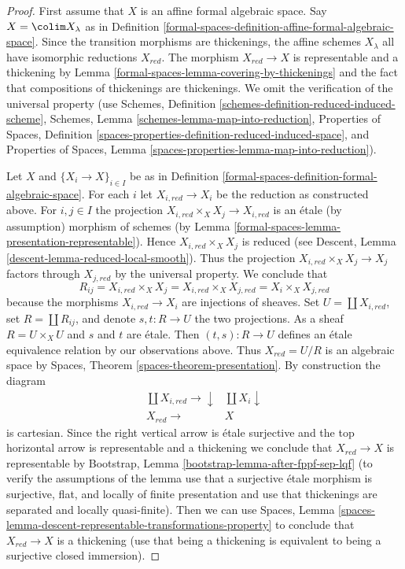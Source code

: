 \begin{proof}
First assume that $X$ is an affine formal algebraic space.
Say $X = \colim X_\lambda$ as in
Definition \ref{formal-spaces-definition-affine-formal-algebraic-space}.
Since the transition morphisms are thickenings, the affine
schemes $X_\lambda$ all have isomorphic reductions $X_{red}$.
The morphism $X_{red} \to X$ is representable and a thickening
by Lemma \ref{formal-spaces-lemma-covering-by-thickenings} and the fact that
compositions of thickenings are thickenings. We omit the
verification of the universal
property (use Schemes, Definition
\ref{schemes-definition-reduced-induced-scheme},
Schemes, Lemma \ref{schemes-lemma-map-into-reduction},
Properties of Spaces, Definition
\ref{spaces-properties-definition-reduced-induced-space}, and
Properties of Spaces, Lemma \ref{spaces-properties-lemma-map-into-reduction}).

\medskip\noindent
Let $X$ and $\{X_i \to X\}_{i \in I}$ be as in
Definition \ref{formal-spaces-definition-formal-algebraic-space}.
For each $i$ let $X_{i, red} \to X_i$ be the reduction as
constructed above. For $i, j \in I$ the projection
$X_{i, red} \times_X X_j \to X_{i, red}$ is an \'etale (by assumption)
morphism of schemes (by Lemma \ref{formal-spaces-lemma-presentation-representable}).
Hence $X_{i, red} \times_X X_j$ is reduced (see
Descent, Lemma \ref{descent-lemma-reduced-local-smooth}).
Thus the projection $X_{i, red} \times_X X_j \to X_j$ factors
through $X_{j, red}$ by the universal property. We conclude that
$$
R_{ij} = X_{i, red} \times_X X_j = X_{i, red} \times_X X_{j, red} =
X_i \times_X X_{j, red}
$$
because the morphisms $X_{i, red} \to X_i$ are injections of sheaves.
Set $U = \coprod X_{i, red}$, set
$R = \coprod R_{ij}$, and denote $s, t : R \to U$ the two
projections. As a sheaf $R = U \times_X U$ and $s$ and $t$
are \'etale. Then $(t, s) : R \to U$ defines an \'etale equivalence
relation by our observations above. Thus $X_{red} = U/R$ is an
algebraic space by Spaces, Theorem \ref{spaces-theorem-presentation}.
By construction the diagram
$$
\begin{array}{cc}\coprod X_{i, red} \longrightarrow\downarrow & \coprod X_i \downarrow \\ X_{red} \longrightarrow & X\end{array}
$$
is cartesian. Since the right vertical arrow is \'etale surjective
and the top horizontal arrow is representable and a thickening
we conclude that $X_{red} \to X$ is representable by
Bootstrap, Lemma \ref{bootstrap-lemma-after-fppf-sep-lqf}
(to verify the assumptions of the lemma use that a surjective
\'etale morphism is surjective, flat, and locally of finite
presentation and use that thickenings are separated and locally quasi-finite).
Then we can use Spaces, Lemma
\ref{spaces-lemma-descent-representable-transformations-property}
to conclude that $X_{red} \to X$ is a thickening
(use that being a thickening is equivalent to being
a surjective closed immersion).


\end{proof}

